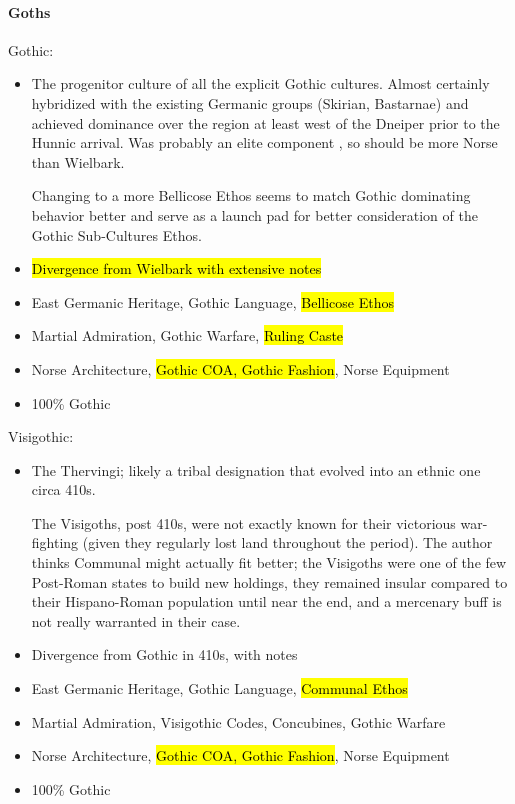\documentclass{article}
\begin{document}
	\paragraph{Goths}
	Gothic:
	\begin{itemize}
		\item The progenitor culture of all the explicit Gothic cultures.
		Almost certainly hybridized with the existing Germanic groups (Skirian, Bastarnae) and achieved dominance over the region at least west of the Dneiper prior to the Hunnic arrival.
		Was probably an elite component \cite{HeatherEmpiresAndBarbarians}, so should be more Norse than Wielbark.
		
		Changing to a more Bellicose Ethos seems to match Gothic dominating behavior better and serve as a launch pad for better consideration of the Gothic Sub-Cultures Ethos.
		\item \hl{Divergence from Wielbark with extensive notes}
		\item East Germanic Heritage, Gothic Language, \hl{Bellicose Ethos}
		\item Martial Admiration, Gothic Warfare, \hl{Ruling Caste}
		\item Norse Architecture, \hl{Gothic COA, Gothic Fashion}, Norse Equipment
		\item 100\% Gothic
	\end{itemize}
	
	Visigothic:
	\begin{itemize}
		\item The Thervingi; likely a tribal designation that evolved into an ethnic one circa 410s.
		
		The Visigoths, post 410s, were not exactly known for their victorious war-fighting (given they regularly lost land throughout the period).
		The author thinks Communal might actually fit better; the Visigoths were one of the few Post-Roman states to build new holdings, they remained insular compared to their Hispano-Roman population until near the end, and a mercenary buff is not really warranted in their case.
		\item Divergence from Gothic in 410s, with notes
		\item East Germanic Heritage, Gothic Language, \hl{Communal Ethos}
		\item Martial Admiration, Visigothic Codes, Concubines, Gothic Warfare
		\item Norse Architecture, \hl{Gothic COA, Gothic Fashion}, Norse Equipment
		\item 100\% Gothic
	\end{itemize}
	
\end{document}
